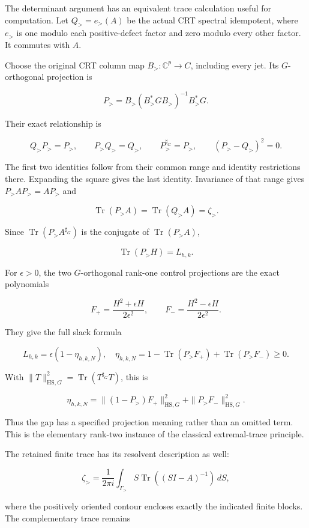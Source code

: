 The determinant argument has an equivalent trace calculation useful for
computation. Let \(Q_{>}=e_{>}(A)\) be the actual CRT spectral
idempotent, where \(e_{>}\) is one modulo each positive-defect factor
and zero modulo every other factor. It commutes with \(A\).

Choose the original CRT column map \(B_{>}:\mathbb C^p\to C\), including
every jet. Its \(G\)-orthogonal projection is

\[
\boxed{
P_{>}=B_{>}(B_{>}^*GB_{>})^{-1}B_{>}^*G.
}
\]

Their exact relationship is

\[
Q_{>}P_{>}=P_{>},\qquad P_{>}Q_{>}=Q_{>},\qquad
P_{>}^{\sharp_G}=P_{>},\qquad(P_{>}-Q_{>})^2=0.
\]

The first two identities follow from their common range and identity
restrictions there. Expanding the square gives the last identity.
Invariance of that range gives \(P_{>}AP_{>}=AP_{>}\) and

\[
\operatorname{Tr}(P_{>}A)=\operatorname{Tr}(Q_{>}A)=\zeta_{>}.
\]

Since \(\operatorname{Tr}(P_{>}A^{\sharp_G})\) is the conjugate of
\(\operatorname{Tr}(P_{>}A)\),

\[
\boxed{\operatorname{Tr}(P_{>}H)=L_{h,k}.}
\]

For \(\epsilon>0\), the two \(G\)-orthogonal rank-one control
projections are the exact polynomials

\[
F_+=\frac{H^2+\epsilon H}{2\epsilon^2},\qquad
F_-=\frac{H^2-\epsilon H}{2\epsilon^2}.
\]

They give the full slack formula

\[
\boxed{
L_{h,k}=\epsilon(1-\eta_{h,k,N}),
\quad
\eta_{h,k,N}=1-\operatorname{Tr}(P_{>}F_+)
                  +\operatorname{Tr}(P_{>}F_-)\geq0.
}
\]

With \(\|T\|_{\mathrm{HS},G}^2=\operatorname{Tr}(T^{\sharp_G}T)\), this
is

\[
\eta_{h,k,N}
=\|(1-P_{>})F_+\|_{\mathrm{HS},G}^2
 +\|P_{>}F_-\|_{\mathrm{HS},G}^2.
\]

Thus the gap has a specified projection meaning rather than an omitted
term. This is the elementary rank-two instance of the classical
extremal-trace principle.

The retained finite trace has its resolvent description as well:

\[
\zeta_{>}
=\frac1{2\pi i}\int_{\Gamma_{>}}
S\operatorname{Tr}((SI-A)^{-1})\,dS,
\]

where the positively oriented contour encloses exactly the indicated
finite blocks. The complementary trace remains

